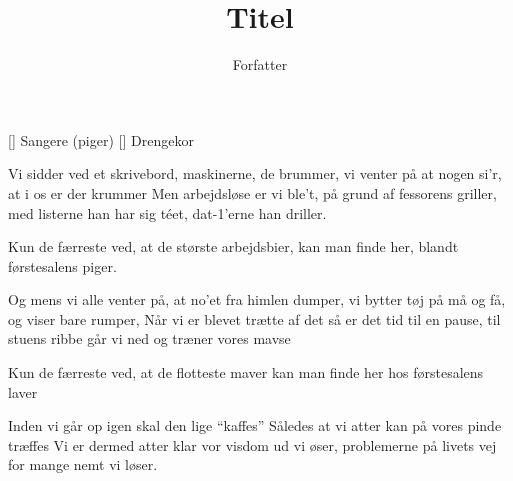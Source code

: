 \documentclass[a4paper,11pt]{article}
\title{Titel}
\author{Forfatter}
\begin{document}
\maketitle

\begin{roles}
[] Sangere (piger)
[] Drengekor
\end{roles}

\begin{song}



 Vi sidder ved et skrivebord,
          maskinerne, de brummer,
          vi venter på at nogen si'r,
          at i os er der krummer
          Men arbejdsløse er vi ble't,
          på grund af fessorens griller,
          med listerne han har sig téet,
          dat-1'erne han driller.

 Kun de færreste ved,
          at de største arbejdsbier,
          kan man finde her,
          blandt førstesalens piger.





 Og mens vi alle venter på,
          at no'et fra himlen dumper,
          vi bytter tøj på må og få,
          og viser bare rumper,
          Når vi er blevet trætte af det
          så er det tid til en pause,
          til stuens ribbe går vi ned
          og træner vores mavse

 Kun de færreste ved,
          at de flotteste maver
          kan man finde her
          hos førstesalens laver





 Inden vi går op igen
          skal den lige ``kaffes''
          Således at vi atter kan 
          på vores pinde træffes
          Vi er dermed atter klar
          vor visdom ud vi øser,
          problemerne på livets vej
          for mange nemt vi løser.


\end{song}
\end{document}
